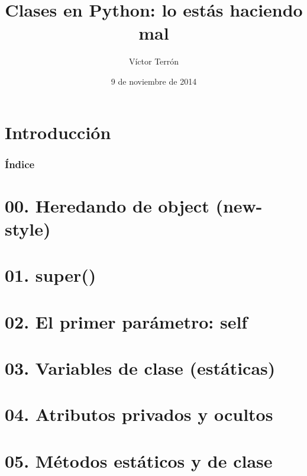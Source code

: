 \documentclass[14pt]{beamer}
\title{Clases en Python: lo estás haciendo mal}
\author{Víctor Terrón}
\date{9 de noviembre de 2014}
\institute{IAA-CSIC}
\newcommand{\punto}[1]{}
\begin{document}
\section{Introducción}



\begin{frame}
  \frametitle{Índice}
  \tableofcontents
\end{frame}


\section{00. Heredando de object (new-style)}
\punto{00}

\section{01. super()}
\punto{01}

\section{02. El primer parámetro: self}
\punto{02}

{
\begin{frame}[plain]
\end{frame}
}

\section{03. Variables de clase (estáticas)}
\punto{03}

\section{04. Atributos privados y ocultos}
\punto{04}

\section{05. Métodos estáticos y de clase}
\punto{05}

{
\begin{frame}[plain]
\end{frame}
}
\end{document}
